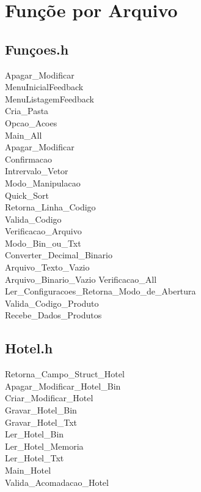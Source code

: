 \documentclass[titlepage]{article}
\begin{document}
	\newpage
	\section{Funçõe por Arquivo}



			
	\subsection{Funçoes.h}
	Apagar\_Modificar\\
	MenuInicialFeedback\\
	MenuListagemFeedback\\
	Cria\_Pasta\\
	Opcao\_Acoes\\
	Main\_All\\
	Apagar\_Modificar\\
	Confirmacao\\
	Intrervalo\_Vetor\\
	Modo\_Manipulacao\\
	Quick\_Sort\\
	Retorna\_Linha\_Codigo\\
	Valida\_Codigo\\
	Verificacao\_Arquivo\\
	Modo\_Bin\_ou\_Txt\\
	Converter\_Decimal\_Binario\\
	Arquivo\_Texto\_Vazio\\
	Arquivo\_Binario\_Vazio	
	Verificacao\_All\\
	Ler\_Configuracoes\_Retorna\_Modo\_de\_Abertura\\
	Valida\_Codigo\_Produto\\
	Recebe\_Dados\_Produtos\\
	
	\subsection{Hotel.h}
	Retorna\_Campo\_Struct\_Hotel\\
	Apagar\_Modificar\_Hotel\_Bin\\
	Criar\_Modificar\_Hotel\\
	Gravar\_Hotel\_Bin\\
	Gravar\_Hotel\_Txt\\
	Ler\_Hotel\_Bin\\
	Ler\_Hotel\_Memoria\\
	\label{oi}Ler\_Hotel\_Txt\\
	Main\_Hotel\\
	Valida\_Acomadacao\_Hotel\\
	
\end{document}
